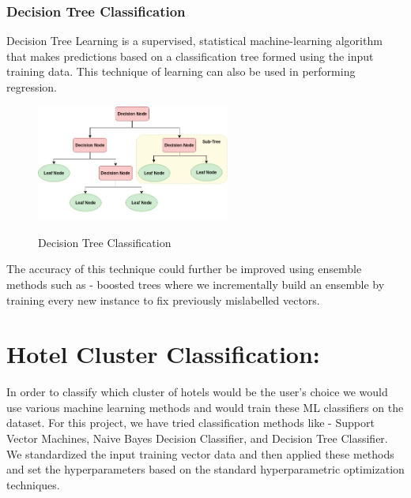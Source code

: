 \documentclass[conference]{IEEEtran}
\begin{document}
\subsubsection{Decision Tree Classification}
Decision Tree Learning is a supervised, statistical machine-learning algorithm that makes predictions based on a classification tree formed using the input training data. This technique of learning can also be used in performing regression.\\
\begin{figure}[htbp] %
\centering
\includegraphics[width=2.5in]{decision_tree.PNG}
\label{Decision Tree Classification}
\caption{Decision Tree Classification}
\end{figure}
The accuracy of this technique could further be improved using ensemble methods such as - boosted trees where we incrementally build an ensemble by training every new instance to fix previously mislabelled vectors. \cite{stat_learning} \cite{d_tree}

\section{\textbf{Hotel Cluster Classification:}}
In order to classify which cluster of hotels would be the user's choice we would use various machine learning methods and would train these ML classifiers on the dataset. For this project, we have tried classification methods like - Support Vector Machines, Naive Bayes Decision Classifier, and Decision Tree Classifier. \\
We standardized the input training vector data and then applied these methods and set the hyperparameters based on the standard hyperparametric optimization techniques.\cite{9257290}
\end{document}
